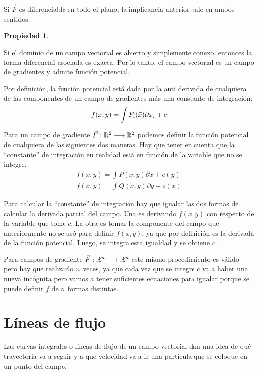 \documentclass[a5paper,12pt,twoside]{book}
\newtheorem{prop}{{Propiedad}}[chapter]
\begin{document}
Si $\Vec{F}$ es diferenciable en todo el plano, la implicancia anterior vale en ambos sentidos.

\begin{mdframed}[style=MyFrame1]
    \begin{prop}
    \end{prop}
    Si el dominio de un campo vectorial es abierto y simplemente conexo, entonces la forma diferencial asociada es exacta. Por lo tanto, el campo vectorial es un campo de gradientes y admite función potencial.
\end{mdframed}

Por definición, la función potencial está dada por la anti derivada de cualquiera de las componentes de un campo de gradientes más una constante de integración:
\begin{equation*}
    f(x,y) = \int F_i(\Vec{x}) \partial x_i + c
\end{equation*}

Para un campo de gradiente $\Vec{F}:\mathbb{R}^2 \longrightarrow \mathbb{R}^2$ podemos definir la función potencial de cualquiera de las siguientes dos maneras. Hay que tener en cuenta que la ``constante'' de integración en realidad está en función de la variable que no se integre.
\begin{gather*}
    f(x,y) = \int P(x,y) \partial x + c(y)
    \\
    f(x,y) = \int Q(x,y) \partial y + c(x)
\end{gather*}

Para calcular la ``constante'' de integración hay que igualar las dos formas de calcular la derivada parcial del campo. Una es derivando $f(x,y)$ con respecto de la variable que tome $c$. La otra es tomar la componente del campo que anteriormente no se usó para definir $f(x,y)$, ya que por definición es la derivada de la función potencial. Luego, se integra esta igualdad y se obtiene $c$.

Para campos de gradiente $\Vec{F}:\mathbb{R}^n \longrightarrow \mathbb{R}^n$ este mismo procedimiento es válido pero hay que realizarlo $n$ veces, ya que cada vez que se integre $c$ va a haber una nueva incógnita pero vamos a tener suficientes ecuaciones para igualar porque se puede definir $f$ de $n$ formas distintas.


\section{Líneas de flujo}

Las curvas integrales o líneas de flujo de un campo vectorial dan una idea de qué trayectoria va a seguir y a qué velocidad va a ir una partícula que se coloque en un punto del campo.
\end{document}
